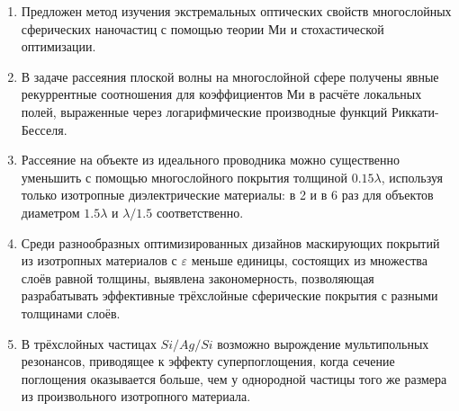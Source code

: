 {}  %
\mynobreakpar\begin{enumerate}
  \item Предложен метод изучения экстремальных оптических свойств
    многослойных сферических наночастиц с помощью теории Ми и
    стохастической оптимизации.
  \item В задаче рассеяния плоской волны на многослойной сфере
    получены явные рекуррентные соотношения для коэффициентов Ми в
    расчёте локальных полей, выраженные через логарифмические
    производные функций Риккати-Бесселя. %
  \item Рассеяние на объекте из идеального проводника можно
    существенно уменьшить с помощью многослойного покрытия толщиной
    $0.15\lambda$, используя только изотропные диэлектрические
    материалы: в 2 и в 6 раз для объектов диаметром $1.5\lambda$ и
    $\lambda/1.5$ соответственно.
  \item %
    Среди разнообразных оптимизированных дизайнов маскирующих покрытий из
    изотропных материалов с $\varepsilon$ меньше единицы, состоящих из
    множества слоёв равной толщины, выявлена закономерность,
    позволяющая разрабатывать эффективные трёхслойные сферические
    покрытия с разными толщинами слоёв. %


  \item В трёхслойных частицах $Si/Ag/Si$ возможно вырождение
    мультипольных резонансов, приводящее к эффекту суперпоглощения,
    когда сечение поглощения оказывается больше, чем у однородной
    частицы того же размера из произвольного изотропного материала.
\end{enumerate}


